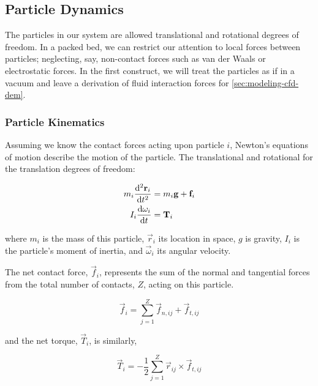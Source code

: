 \subsection{Particle Dynamics}\label{sec:particle-dynamics}

The particles in our system are allowed translational and rotational degrees of freedom. In a packed bed, we can restrict our attention to local forces between particles; neglecting, say, non-contact forces such as van der Waals or electrostatic forces. In the first construct, we will treat the particles as if in a vacuum and leave a derivation of fluid interaction forces for \cref{sec:modeling-cfd-dem}.



\subsubsection{Particle Kinematics}

Assuming we know the contact forces acting upon particle $i$, Newton's equations of motion describe the motion of the particle. The translational and rotational for the translation degrees of freedom:

\begin{subequations}
\label{eq:newtons-second}
\begin{align}
	m_i  \frac{\mathrm{d}^2{\mathbf{r}_i}}{\mathrm{d}t^2}   & = m_i\mathbf{g} + \mathbf{f}_i \label{eq:newton-translational} \\
	I_i\frac{\mathrm{d}{\mathbf{\omega}_i}}{\mathrm{d}t} & = \mathbf{T}_i \label{eq:newton-rotational}
\end{align}
\end{subequations}

where $m_i$ is the mass of this particle, $\vec{r}_i$ its location in space, $g$ is gravity, $I_i$ is the particle's moment of inertia, and $\vec{\omega}_i$ its angular velocity.

The net contact force, $\vec{f}_i$, represents the sum of the normal and tangential forces from the total number of contacts, $Z$, acting on this particle.

\begin{equation}
 	\vec{f}_i = \sum_{j=1}^{Z} \vec{f}_{n,ij} + \vec{f}_{t,ij}
 \end{equation} 

and the net torque, $\vec{T}_i$, is similarly,

\begin{equation}
	\vec{T}_i = -\frac{1}{2}\sum_{j=1}^{Z} \vec{r}_{ij} \times \vec{f}_{t,ij}
\end{equation}



